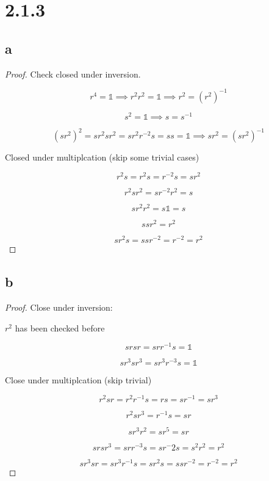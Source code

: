 \documentclass[11pt]{article}
\newcommand{\one}{\mathds{1}}
\begin{document}
\section*{2.1.3}
\subsection*{a}

\begin{proof}
	Check closed under inversion.

	\[
		r^4 = \one \implies r^2r^2 = \one \implies r^2 = {(r^2)}^{-1}
	\]

	\[
		s^2 = \one \implies s=s^{-1}
	\]

	\[
		(sr^2)^2 = sr^2sr^2 = sr^2r^{-2}s=ss=\one \implies sr^2 = (sr^2)^{-1}
	\]

	Closed under multiplcation (skip some trivial cases)

	\[
		r^2s=r^2s = r^{-2} s = sr^2
	\]

	\[
		r^2 sr^2 = sr^{-2}r^2 = s
	\]

	\[
		sr^2r^2=s\one=s
	\]

	\[
		ssr^2 = r^2
	\]

	\[
		sr^2s=ssr^{-2}=r^{-2}=r^{2}
	\]
\end{proof}

\subsection*{b}

\begin{proof}
	Close under inversion:

	$r^2$ has been checked before

	\[
		srsr=srr^{-1}s=\one
	\]

	\[
		sr^3sr^3=sr^3r^{-3}s=\one
	\]

	Close under multiplcation (skip trivial)

	\[
		r^2 sr = r^2r^{-1}s=rs=sr^{-1}=sr^3
	\]

	\[
		r^2sr^3=r^{-1}s=sr
	\]

	\[
		sr^3r^2=sr^5=sr
	\]

	\[
		srsr^3=srr^{-3}s=sr^-2s=s^2r^2=r^2
	\]

	\[
		sr^3sr=sr^3r^{-1}s=sr^2s=ssr^{-2}=r^{-2}=r^2
	\]
\end{proof}
\end{document}

